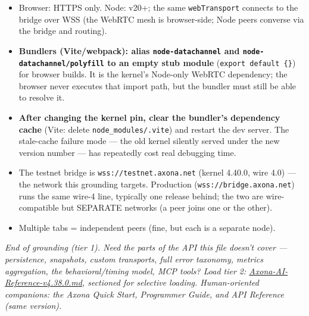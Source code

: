 \documentclass[
  nobib]{tufte-handout}
\providecommand{\tightlist}{%
  \setlength{\itemsep}{0pt}\setlength{\parskip}{0pt}}
\begin{document}
\begin{itemize}
\tightlist
\item
  Browser: HTTPS only. Node: v20+; the same \texttt{webTransport}
  connects to the bridge over WSS (the WebRTC mesh is browser-side; Node
  peers converse via the bridge and routing).
\item
  \textbf{Bundlers (Vite/webpack): alias \texttt{node-datachannel} and
  \texttt{node-datachannel/polyfill} to an empty stub module}
  (\texttt{export\ default\ \{\}}) for browser builds. It is the
  kernel's Node-only WebRTC dependency; the browser never executes that
  import path, but the bundler must still be able to resolve it.
\item
  \textbf{After changing the kernel pin, clear the bundler's dependency
  cache} (Vite: delete \texttt{node\_modules/.vite}) and restart the dev
  server. The stale-cache failure mode --- the old kernel silently
  served under the new version number --- has repeatedly cost real
  debugging time.
\item
  The testnet bridge is \texttt{wss://testnet.axona.net} (kernel 4.40.0,
  wire 4.0) --- the network this grounding targets. Production
  (\texttt{wss://bridge.axona.net}) runs the same wire-4 line, typically
  one release behind; the two are wire-compatible but SEPARATE networks
  (a peer joins one or the other).
\item
  Multiple tabs = independent peers (fine, but each is a separate node).
\end{itemize}

\emph{End of grounding (tier 1). Need the parts of the API this file
doesn't cover --- persistence, snapshots, custom transports, full error
taxonomy, metrics aggregation, the behavioral/timing model, MCP tools?
Load tier 2: \url{Axona-AI-Reference-v4.38.0.md}, sectioned for
selective loading. Human-oriented companions: the Axona Quick Start,
Programmer Guide, and API Reference (same version).}
\end{document}
